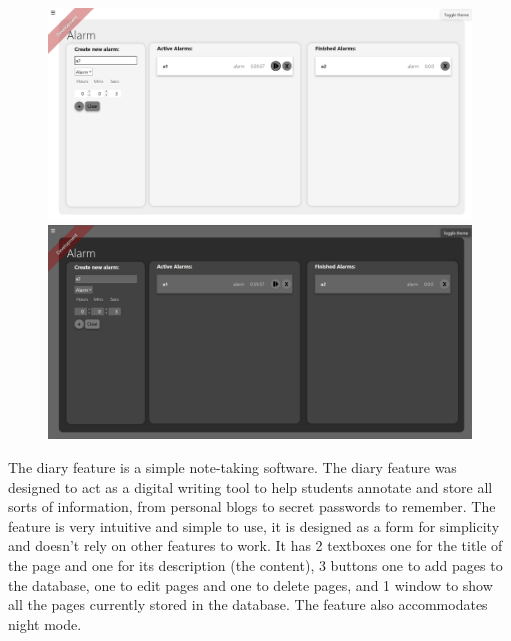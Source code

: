 \documentclass[a4paper]{article}
\begin{document}
\begin{figure}[H]
  \centering
  \begin{minipage}{0.49\textwidth}
    \centering
    \includegraphics[width=\linewidth]{./image/AlarmTimer_light.png}
  \end{minipage}\hfill
  \begin{minipage}{0.49\textwidth}
    \centering
    \includegraphics[width=\linewidth]{./image/AlarmTimer_dark.png}
  \end{minipage}
\end{figure}

The diary feature is a simple note-taking software. The diary feature was designed to act as a digital writing tool to help 
students annotate and store all sorts of information, from personal blogs to secret passwords to remember. The feature is 
very intuitive and simple to use, it is designed as a form for simplicity and doesn’t rely on other features to work. It has 2 
textboxes one for the title of the page and one for its description (the content), 3 buttons one to add pages to the database, 
one to edit pages and one to delete pages, and 1 window to show all the pages currently stored in the database. The 
feature also accommodates night mode.
\end{document}
